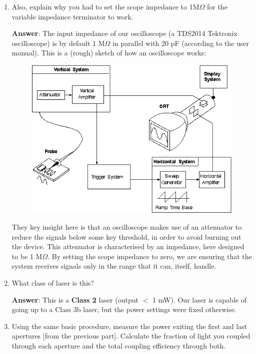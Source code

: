 \documentclass[10pt,a4paper]{article}
\begin{document}
\begin{enumerate}
\item Also, explain why you had to set the scope impedance to 1M$\Omega$ for the variable impedance terminator to work. 

\textbf{Answer}: The input impedance of our oscilloscope (a TDS2014 Tektronix oscilloscope) is by default 1 M$\Omega$ in parallel with 20 pF (according to the user manual). This is a (rough) sketch of how an oscilloscope works:
\begin{figure}[h]
\centering
\includegraphics[scale = 0.8]{oscillosco6_06.png} 
\end{figure} 
They key insight here is that an oscilloscope makes use of an attenuator to reduce the signals below some key threshold, in order to avoid burning out the device. This attenuator is characterised by an impedance, here designed to be 1 M$\Omega$. By setting the scope impedance to zero, we are ensuring that the system receives signals only in the range that it can, itself, handle.
\item What class of laser is this?

\textbf{Answer}: This is a \textbf{Class 2} laser (output $<$ 1 mW). Our laser is capable of going up to a Class 3b laser, but the power settings were fixed otherwise.
\item Using the same basic procedure, measure the power exiting the first and last apertures [from the previous part]. Calculate the fraction of light you coupled through each aperture and the total coupling efficiency through both.


\end{enumerate}
\end{document}
